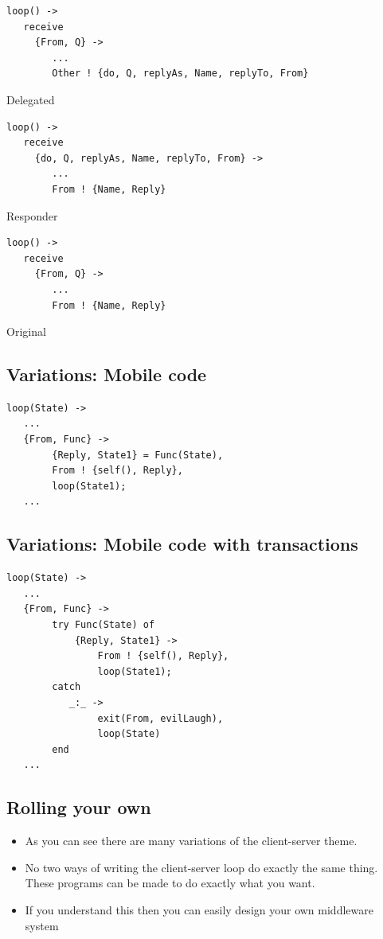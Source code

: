 \documentclass[12pt]{article}
\begin{document}
\begin{itemize}
\begin{verbatim}
loop() ->
   receive 
     {From, Q} ->    
        ...
        Other ! {do, Q, replyAs, Name, replyTo, From}
\end{verbatim}
Delegated

\begin{verbatim}
loop() ->
   receive 
     {do, Q, replyAs, Name, replyTo, From} ->    
        ...
        From ! {Name, Reply}
\end{verbatim}
Responder

\begin{verbatim}
loop() ->
   receive 
     {From, Q} ->    
        ...
        From ! {Name, Reply}
\end{verbatim}
Original

\subsection{Variations: Mobile code}

\begin{verbatim}
loop(State) ->
   ... 
   {From, Func} ->    
        {Reply, State1} = Func(State),
        From ! {self(), Reply},
        loop(State1);
   ...
\end{verbatim}

\subsection{Variations: Mobile code with transactions}

\begin{verbatim}
loop(State) ->
   ... 
   {From, Func} ->  
        try Func(State) of
            {Reply, State1} ->
                From ! {self(), Reply},
                loop(State1);
        catch
           _:_ ->
                exit(From, evilLaugh),
                loop(State)
        end
   ...
\end{verbatim}

\subsection{Rolling your own}

\begin{itemize}
\item As you can see there are many variations of the client-server theme.
\item No two ways of writing the client-server loop do exactly the same thing.
These programs can be made to do exactly what you want. 
\item If you understand this then you can easily design your own middleware system
\end{itemize}


\end{itemize}
\end{document}
